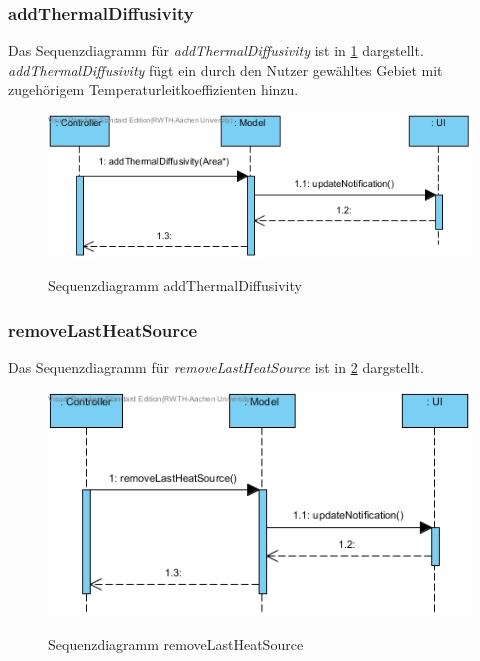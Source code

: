 \subsubsection*{addThermalDiffusivity}

Das Sequenzdiagramm für \emph{addThermalDiffusivity} ist in \ref{Sequenzdiagramm addThermalDiffusivity} dargstellt. \emph{addThermalDiffusivity} fügt ein durch den Nutzer gewähltes Gebiet mit zugehörigem Temperaturleitkoeffizienten hinzu.

\begin{figure}[H]
	\centering
	\includegraphics[scale=.6]{Bilder/Model__addThermalDiffusivity().jpg}\\
	\caption{Sequenzdiagramm addThermalDiffusivity}
	\label{Sequenzdiagramm addThermalDiffusivity}
\end{figure}

\subsubsection*{removeLastHeatSource}

Das Sequenzdiagramm für \emph{removeLastHeatSource} ist in \ref{Sequenzdiagramm removeLastHeatSource} dargstellt.

\begin{figure}[H]
	\centering
	\includegraphics[scale=.6]{Bilder/Model__removeLastHeatSource().jpg}\\
	\caption{Sequenzdiagramm removeLastHeatSource}
	\label{Sequenzdiagramm removeLastHeatSource}
\end{figure}

